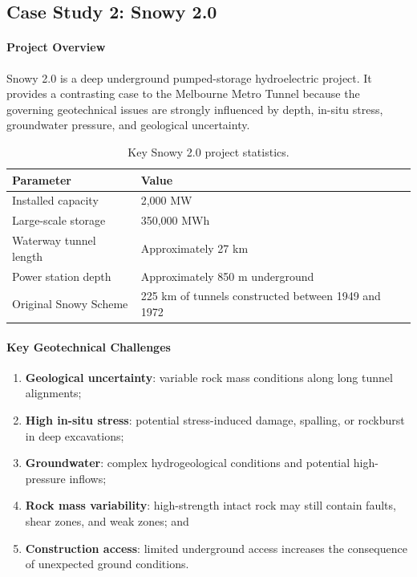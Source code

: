 \subsection{Case Study 2: Snowy 2.0}

\paragraph{Project Overview}
Snowy 2.0 is a deep underground pumped-storage hydroelectric project. It provides a contrasting case to the Melbourne Metro Tunnel because the governing geotechnical issues are strongly influenced by depth, in-situ stress, groundwater pressure, and geological uncertainty.

\begin{table}[H]
\centering
\small
\begin{tabularx}{1\textwidth}{X l}
\toprule
\textbf{Parameter} & \textbf{Value} \\
\midrule
Installed capacity & 2,000 MW \\
Large-scale storage & 350,000 MWh \\
Waterway tunnel length & Approximately 27 km \\
Power station depth & Approximately 850 m underground \\
Original Snowy Scheme & 225 km of tunnels constructed between 1949 and 1972 \\
\bottomrule
\end{tabularx}
\caption{Key Snowy 2.0 project statistics.}
\end{table}

\paragraph{Key Geotechnical Challenges}
\begin{enumerate}
 \item \textbf{Geological uncertainty}: variable rock mass conditions along long tunnel alignments;
 \item \textbf{High in-situ stress}: potential stress-induced damage, spalling, or rockburst in deep excavations;
 \item \textbf{Groundwater}: complex hydrogeological conditions and potential high-pressure inflows;
 \item \textbf{Rock mass variability}: high-strength intact rock may still contain faults, shear zones, and weak zones; and
 \item \textbf{Construction access}: limited underground access increases the consequence of unexpected ground conditions.
\end{enumerate}

